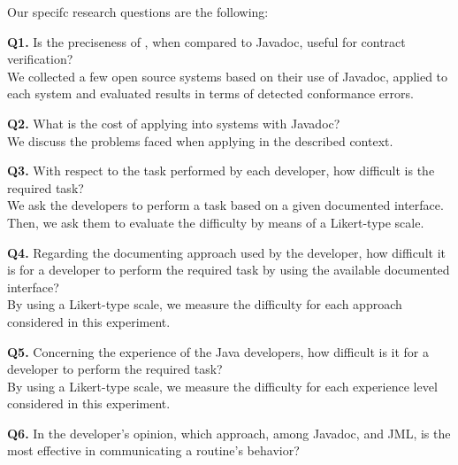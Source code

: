 Our specifc research questions are the following:

\noindent\textbf{Q1.} Is the preciseness of \contractjdoc{}, when compared to Javadoc, useful for contract verification?\\
We collected a few open source systems based on their use of Javadoc, applied \contractjdoc{}
to each system and evaluated results in terms of detected conformance errors.

\noindent\textbf{Q2.} What is the cost of applying \contractjdoc{} into systems with Javadoc?\\
We discuss the problems faced when applying \contractjdoc{} in the described context.

\noindent\textbf{Q3.} With respect to the task performed by each developer, how
difficult is the required task?\\
We ask the developers to perform a task based on a given documented interface.
Then, we ask them to evaluate the difficulty by means of a Likert-type scale.

\noindent\textbf{Q4.} Regarding the documenting approach used by the developer,
how difficult it is for a developer to perform the required task by using the
available documented interface?\\
By using a Likert-type scale, we measure the difficulty for each approach
considered in this experiment.
  
\noindent\textbf{Q5.} Concerning the experience of the Java developers, how
difficult is it for a developer to perform the required task?\\  
By using a Likert-type scale, we measure the difficulty for each experience level
considered in this experiment.

\noindent\textbf{Q6.} In the developer's opinion, which approach, among Javadoc,
\contractjdoc{} and JML, is the most effective in communicating a routine's
behavior? \\
